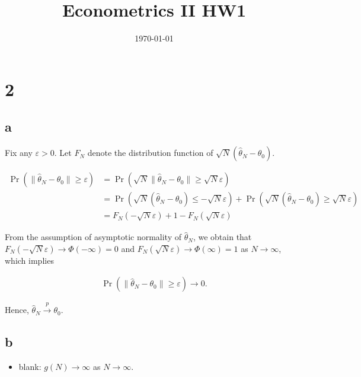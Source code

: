\documentclass[11pt]{article}
\renewcommand{\hat}{\widehat}
\newcommand{\pto}{\overset{p}\rightarrow}
\theoremstyle{definition}
\begin{document}
\title{Econometrics II HW1} %
\date{\today}

\maketitle

\pagebreak

\section*{2}
\subsection*{a}

Fix any $\varepsilon > 0$. Let $F_N$ denote the distribution function of $\sqrt{N} (\hat{\theta}_N - \theta_0)$.

\begin{align*}
    \Pr( \lVert \hat{\theta}_N - \theta_0 \rVert \geq \varepsilon)
    &= \Pr( \sqrt{N} \lVert \hat{\theta}_N - \theta_0 \rVert \geq \sqrt{N} \varepsilon) \\
    &= \Pr( \sqrt{N} (\hat{\theta}_N - \theta_0) \leq - \sqrt{N} \varepsilon) +
    \Pr ( \sqrt{N} (\hat{\theta}_N - \theta_0 )\geq  \sqrt{N} \varepsilon) \\
    &= F_N(- \sqrt{N} \varepsilon) + 1 - F_N(\sqrt{N} \varepsilon)
\end{align*}

From the assumption of asymptotic normality of $\hat{\theta}_N$, we obtain that $F_N(- \sqrt{N} \varepsilon) \to \Phi(- \infty) = 0$ and $F_N(\sqrt{N} \varepsilon) \to \Phi(\infty) = 1$ as $N \to \infty$, which implies

\begin{align*}
    \Pr( \lVert \hat{\theta}_N - \theta_0 \rVert \geq \varepsilon) \to 0.
\end{align*}

Hence, $\hat{\theta}_N \pto \theta_0$.

\subsection*{b}

\begin{itemize}
    \item blank: $g(N) \to \infty$ as $N\to \infty$.
\end{itemize}
\end{document}
